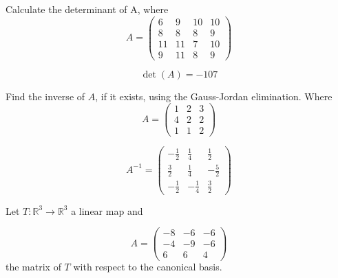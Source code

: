 \begin{questions}

\question Calculate the determinant of A, where
$$
A=\left(\begin{array}{rrrr}
6 & 9 & 10 & 10 \\
8 & 8 & 8 & 9 \\
11 & 11 & 7 & 10 \\
9 & 11 & 8 & 9
\end{array}\right)
$$

\begin{solution}
$$\det(A)=-107$$
\end{solution}

\question Find the inverse of $A$, if it exists, using the Gauss-Jordan elimination. Where
$$
A=\left(\begin{array}{rrr}
1 & 2 & 3 \\
4 & 2 & 2 \\
1 & 1 & 2
\end{array}\right)
$$

\begin{solution}
$$A^{-1}=\left(\begin{array}{rrr}
-\frac{1}{2} & \frac{1}{4} & \frac{1}{2} \\
\frac{3}{2} & \frac{1}{4} & -\frac{5}{2} \\
-\frac{1}{2} & -\frac{1}{4} & \frac{3}{2}
\end{array}\right)$$
\end{solution}

\question Let $T:\mathbb{R}^3\rightarrow\mathbb{R}^3$  a linear map and
 
$$
A=\left(\begin{array}{rrr}
-8 & -6 & -6 \\
-4 & -9 & -6 \\
6 & 6 & 4
\end{array}\right)
$$
the matrix of $T$ with respect to the canonical basis.
\end{questions}

